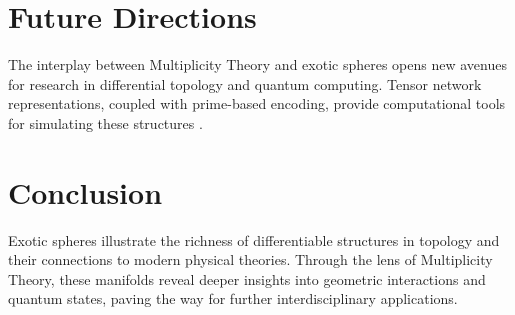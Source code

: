 \documentclass{article}
\theoremstyle{plain}
\begin{document}
\section{Future Directions}
The interplay between Multiplicity Theory and exotic spheres opens new avenues for research in differential topology and quantum computing. Tensor network representations, coupled with prime-based encoding, provide computational tools for simulating these structures \cite{Rosenberg1997}.

\section{Conclusion}
Exotic spheres illustrate the richness of differentiable structures in topology and their connections to modern physical theories. Through the lens of Multiplicity Theory, these manifolds reveal deeper insights into geometric interactions and quantum states, paving the way for further interdisciplinary applications.

\nocite{*}


\end{document}
